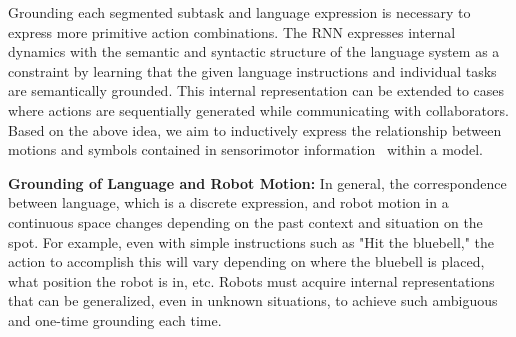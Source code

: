 Grounding each segmented subtask and language expression is necessary to express more primitive action combinations. The RNN expresses internal dynamics with the semantic and syntactic structure of the language system as a constraint by learning that the given language instructions and individual tasks are semantically grounded. This internal representation can be extended to cases where actions are sequentially generated while communicating with collaborators. Based on the above idea, we aim to inductively express the relationship between motions and symbols contained in sensorimotor information~\cite{Harned1990pd} within a model.



\textbf{Grounding of Language and Robot Motion:}
In general, the correspondence between language, which is a discrete expression, and robot motion in a continuous space changes depending on the past context and situation on the spot. For example, even with simple instructions such as "Hit the bluebell," the action to accomplish this will vary depending on where the bluebell is placed, what position the robot is in, etc. Robots must acquire internal representations that can be generalized, even in unknown situations, to achieve such ambiguous and one-time grounding each time.


